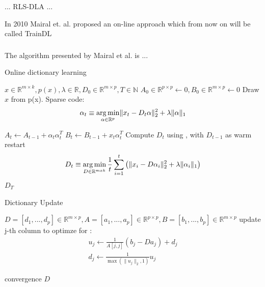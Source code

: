 ... RLS-DLA \cite{Engan2010} ...


In 2010 Mairal et. al. \cite{Mairal2010} proposed an on-line approach which from now on will be called TrainDL

\subsubsection{\trainDL}
\label{sec:mairal}
The algorithm presented by Mairal et al. \cite{Mairal2010} is ...

\begin{algorithm}
\caption{Online dictionary learning \cite{Mairal2010}}
\begin{algorithmic}[1]
\REQUIRE $x \in \mathbb{R}^{m \times k},  p \left( x \right), \lambda \in \mathbb{R}, D_0 \in \mathbb{R}^{m \times p}, T \in \mathbb{N}$
\STATE $A_0 \in \mathbb{R}^{p \times p} \gets  0, B_0 \in \mathbb{R}^{m \times p}\gets 0$
\STATE Draw $x$ from p(x).
\STATE Sparse code:
\begin{align*} 
\alpha_t \equiv \operatorname*{arg\,min}_{\alpha\in\mathbb{R}^{p}}  \lVert x_t - D_t\alpha \rVert^{2}_{2}  +  \lambda \lVert \alpha \rVert_{1}
\end{align*}

\STATE $A_t \gets A_{t-1} + \alpha_t\alpha_t^T$
\STATE $B_t \gets B_{t-1} + x_t\alpha_t^T$
\STATE Compute $D_t$ using , with $D_{t-1}$ as warm restart 
\begin{align} 
D_t \equiv \operatorname*{arg\,min}_{D \in \mathbb{R}^{m x k}}  \frac{1}{t} \sum_{i=1}^t \left( \lVert x_i - D\alpha_i \rVert^{2}_{2}  +  \lambda \lVert \alpha_i \rVert_{1} \right) \label{eq:update}
\end{align}
\ENDFOR
\RETURN $D_T$
\end{algorithmic}
\end{algorithm}


\begin{algorithm}
\caption{Dictionary Update}
\label{alg:update}
\begin{algorithmic}[1]
\REQUIRE $D=[d_1,...,d_p] \in \mathbb{R}^{m \times p}, A=[a_1,...,a_p] \in \mathbb{R}^{p \times p}, B=[b_1,...,b_p] \in \mathbb{R}^{m \times p}$
\REPEAT
{}
\STATE update j-th column to optimze for :
\begin{align*}
u_j \gets \frac{1}{A[j,j]}\left(b_j-Da_j\right)+d_j \\
d_j \gets \frac{1}{\max\left(\lVert u_j \rVert_2,1\right)} u_j
\end{align*}

\ENDFOR
\UNTIL convergence 
\RETURN $D$
\end{algorithmic}
\end{algorithm}

